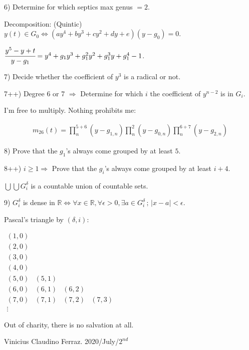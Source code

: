 \documentclass[12pt]{article}
\begin{document}
\vspace{3mm}

6) Determine for which septics max genus $= 2$.

\vspace{3mm}

Decomposition: (Quintic) $y(t) \in G_0 \Leftrightarrow (ay^4 + by^3 + cy^2 + dy + e)(y - g_0) = 0$.

\vspace{3mm}

$\cfrac{y^5 - y + t}{y - g_1} = y^4 + g_1 y^3 + g_1^2 y^2 + g_1^3 y + g_1^4 - 1$. 

\vspace{3mm}

7) Decide whether the coefficient of $y^3$ is a radical or not.

\vspace{3mm}

7++) Degree 6 or 7 $\Rightarrow$ Determine for which $i$ the coefficient of $y^{n - 2}$ is in $G_i$.

\vspace{3mm}

I'm free to multiply. Nothing prohibits me:

\begin{align}
m_{26}(t) = \prod_n^{5+6} (y - g_{1,n}) \prod_n^2 (y - g_{0,n}) \prod_n^{6+7} (y - g_{2,n}) 
\end{align}

8) Prove that the $g_1$'s always come grouped by at least $5$.

\vspace{3mm}

8++) $i \ge 1 \Rightarrow$ Prove that the $g_i$'s always come grouped by at least $i + 4$.

\vspace{3mm}

$\bigcup \bigcup G_i^\delta$ is a countable union of countable sets. 

\vspace{3mm}

9) $G_i^\delta$ is dense in $\mathbb{R} \Leftrightarrow \forall x \in \mathbb{R}, \forall \epsilon > 0, \exists a \in G_i^\delta\,;\,|x - a| < \epsilon$. 

\vspace{3mm}

Pascal's triangle by $(\delta, i)$:

$\begin{matrix} (1,0) \\ (2,0) \\ (3,0) \\ (4,0) \\ (5,0) & (5,1) \\ (6,0) & (6,1) & (6,2) \\ (7,0) & (7,1) & (7,2) & (7,3) \\ \vdots  \end{matrix}$

\vspace{6mm}

Out of charity, there is no salvation at all.

Vinicius Claudino Ferraz. 2020/July/$2^{nd}$
\end{document}
